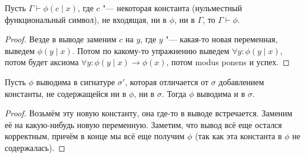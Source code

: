 \begin{lemma}
	Пусть $\Gamma \vdash \phi(c \mid x)$, где $c$ "--- некоторая константа (нульместный функциональный символ), не входящая, ни в $\phi$, ни в $\Gamma$,
	то $\Gamma \vdash \phi$.
\end{lemma}
\begin{proof}
	Везде в выводе заменим $c$ на $y$, где $y$ "--- какая-то новая переменная,
	выведем $\phi(y \mid x)$.
	Потом по какому-то упражнению выведем $\forall y \colon \phi(y \mid x)$,
	потом будет аксиома $\forall y \colon \phi(y \mid x) \to \phi(x)$, потом modus ponens и успех.
\end{proof}

\begin{lemma}
	Пусть $\phi$ выводима в сигнатуре $\sigma'$, которая отличается от $\sigma$ добавлением константы,
	не содержащейся ни в $\phi$, ни в $\sigma$.
	Тогда $\phi$ выводима и в $\sigma$.
\end{lemma}
\begin{proof}
	Возьмём эту новую константу, она где-то в выводе встречается.
	Заменим её на какую-нибудь новую переменную.
	Заметим, что вывод всё еще остался корректным, причём в конце мы всё еще получим $\phi$
	(так как эта константа в $\phi$ не содержалась).
\end{proof}

